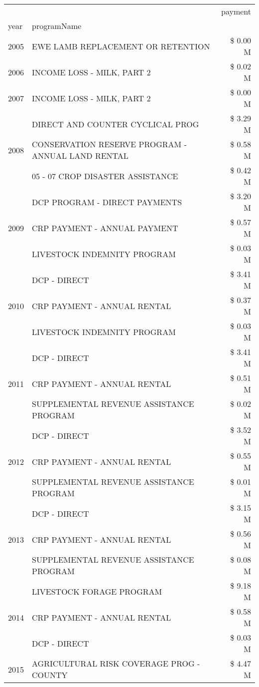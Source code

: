 \begin{tabular}{llr}
\toprule
 &  & payment \\
year & programName &  \\
\midrule
2005 & EWE LAMB REPLACEMENT OR RETENTION & \$ 0.00 M \\
\cline{1-3}
2006 & INCOME LOSS - MILK, PART 2 & \$ 0.02 M \\
\cline{1-3}
2007 & INCOME LOSS - MILK, PART 2 & \$ 0.00 M \\
\cline{1-3}
\multirow[t]{3}{*}{2008} & DIRECT AND COUNTER CYCLICAL PROG & \$ 3.29 M \\
 & CONSERVATION RESERVE PROGRAM - ANNUAL LAND RENTAL & \$ 0.58 M \\
 & 05 - 07 CROP DISASTER ASSISTANCE & \$ 0.42 M \\
\cline{1-3}
\multirow[t]{3}{*}{2009} & DCP PROGRAM - DIRECT PAYMENTS & \$ 3.20 M \\
 & CRP PAYMENT - ANNUAL PAYMENT & \$ 0.57 M \\
 & LIVESTOCK INDEMNITY PROGRAM & \$ 0.03 M \\
\cline{1-3}
\multirow[t]{3}{*}{2010} & DCP - DIRECT & \$ 3.41 M \\
 & CRP PAYMENT - ANNUAL RENTAL & \$ 0.37 M \\
 & LIVESTOCK INDEMNITY PROGRAM & \$ 0.03 M \\
\cline{1-3}
\multirow[t]{3}{*}{2011} & DCP - DIRECT & \$ 3.41 M \\
 & CRP PAYMENT - ANNUAL RENTAL & \$ 0.51 M \\
 & SUPPLEMENTAL REVENUE ASSISTANCE PROGRAM & \$ 0.02 M \\
\cline{1-3}
\multirow[t]{3}{*}{2012} & DCP - DIRECT & \$ 3.52 M \\
 & CRP PAYMENT - ANNUAL RENTAL & \$ 0.55 M \\
 & SUPPLEMENTAL REVENUE ASSISTANCE PROGRAM & \$ 0.01 M \\
\cline{1-3}
\multirow[t]{3}{*}{2013} & DCP - DIRECT & \$ 3.15 M \\
 & CRP PAYMENT - ANNUAL RENTAL & \$ 0.56 M \\
 & SUPPLEMENTAL REVENUE ASSISTANCE PROGRAM & \$ 0.08 M \\
\cline{1-3}
\multirow[t]{3}{*}{2014} & LIVESTOCK FORAGE PROGRAM & \$ 9.18 M \\
 & CRP PAYMENT - ANNUAL RENTAL & \$ 0.58 M \\
 & DCP - DIRECT & \$ 0.03 M \\
\cline{1-3}
\multirow[t]{3}{*}{2015} & AGRICULTURAL RISK COVERAGE PROG - COUNTY & \$ 4.47 M \\

\end{tabular}
